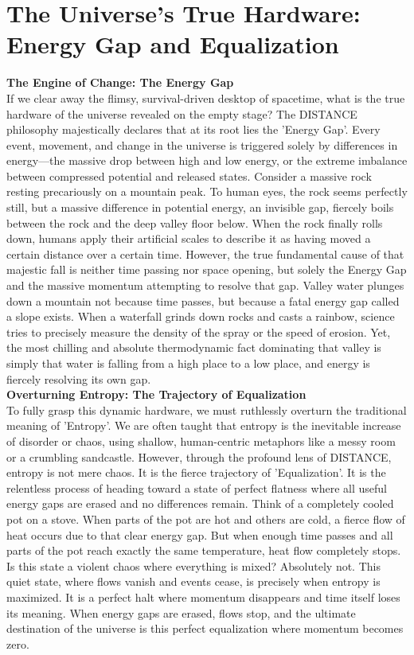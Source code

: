 

\section{The Universe's True Hardware: Energy Gap and Equalization}
\textbf{The Engine of Change: The Energy Gap} \\
If we clear away the flimsy, survival-driven desktop of spacetime, what is the true hardware of the universe revealed on the empty stage? The DISTANCE philosophy majestically declares that at its root lies the 'Energy Gap'. Every event, movement, and change in the universe is triggered solely by differences in energy—the massive drop between high and low energy, or the extreme imbalance between compressed potential and released states.
Consider a massive rock resting precariously on a mountain peak. To human eyes, the rock seems perfectly still, but a massive difference in potential energy, an invisible gap, fiercely boils between the rock and the deep valley floor below. When the rock finally rolls down, humans apply their artificial scales to describe it as having moved a certain distance over a certain time. However, the true fundamental cause of that majestic fall is neither time passing nor space opening, but solely the Energy Gap and the massive momentum attempting to resolve that gap.
Valley water plunges down a mountain not because time passes, but because a fatal energy gap called a slope exists. When a waterfall grinds down rocks and casts a rainbow, science tries to precisely measure the density of the spray or the speed of erosion. Yet, the most chilling and absolute thermodynamic fact dominating that valley is simply that water is falling from a high place to a low place, and energy is fiercely resolving its own gap.\\
\textbf{Overturning Entropy: The Trajectory of Equalization} \\ 
To fully grasp this dynamic hardware, we must ruthlessly overturn the traditional meaning of 'Entropy'. We are often taught that entropy is the inevitable increase of disorder or chaos, using shallow, human-centric metaphors like a messy room or a crumbling sandcastle. However, through the profound lens of DISTANCE, entropy is not mere chaos. It is the fierce trajectory of 'Equalization'. It is the relentless process of heading toward a state of perfect flatness where all useful energy gaps are erased and no differences remain.
Think of a completely cooled pot on a stove. When parts of the pot are hot and others are cold, a fierce flow of heat occurs due to that clear energy gap. But when enough time passes and all parts of the pot reach exactly the same temperature, heat flow completely stops. Is this state a violent chaos where everything is mixed? Absolutely not. This quiet state, where flows vanish and events cease, is precisely when entropy is maximized. It is a perfect halt where momentum disappears and time itself loses its meaning.
When energy gaps are erased, flows stop, and the ultimate destination of the universe is this perfect equalization where momentum becomes zero.
